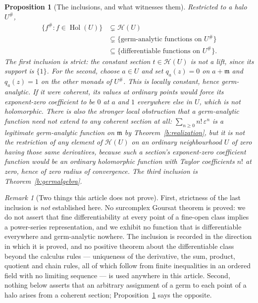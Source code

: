 \documentclass[11pt,a4paper]{article}
\numberwithin{equation}{section}
\newtheorem{proposition}[theorem]{Proposition}
\theoremstyle{definition}
\theoremstyle{remark}
\newtheorem{remark}[theorem]{Remark}
\theoremstyle{plain}
\newcommand{\mm}{\mathfrak m}
\DeclareMathOperator{\Hol}{Hol}
\newcommand{\tm}{t}
\newcommand{\halo}[1]{#1^{\#}}
\newcommand{\Hc}{\mathcal H}
\begin{document}
\begin{proposition}[The inclusions, and what witnesses them]
\label{b:inclusions}
Restricted to a halo $\halo U$,
\[
 \begin{aligned}
 \{f^{\#}:f\in\Hol(U)\}&\subsetneq\Hc(U)\\
 &\subsetneq\{\text{germ-analytic functions on }\halo U\}\\
 &\subseteq\{\text{differentiable functions on }\halo U\}.
 \end{aligned}
\]
The first inclusion is strict: the constant section $\tm\in\Hc(U)$
is not a lift, since its support is $\{1\}$. For the second, choose
$a\in U$ and set $q_a(z)=0$ on $a+\mm$ and $q_a(z)=1$ on the other
monads of $\halo U$. This is locally constant, hence germ-analytic.
If it were coherent, its values at ordinary points would force its
exponent-zero coefficient to be $0$ at $a$ and $1$ everywhere else in
$U$, which is not holomorphic. There is also the stronger local obstruction that a germ-analytic function need not extend to any coherent
section at all: $\sum_{n\ge0}n!\,\varepsilon^{n}$ is a legitimate
germ-analytic function on $\mm$ by
Theorem~\ref{b:realization}, but it is not the restriction of any element
of $\Hc(U)$ on an ordinary neighbourhood $U$ of zero having those same
derivatives, because such a section's exponent-zero coefficient function
would be an ordinary holomorphic function with Taylor coefficients $n!$
at zero, hence of zero radius of convergence. The third inclusion is
Theorem~\ref{b:germalgebra}.
\end{proposition}

\begin{remark}[Two things this article does not prove]
\label{b:no-goursat}
First, strictness of the last inclusion is \emph{not} established here.
No surcomplex Goursat theorem is proved: we do not assert that fine
differentiability at every point of a fine-open class implies a
power-series representation, and we exhibit no function that is
differentiable everywhere and germ-analytic nowhere. The inclusion is
recorded in the direction in which it is proved, and no positive theorem
about the differentiable class beyond the calculus rules --- uniqueness of
the derivative, the sum, product, quotient and chain rules, all of which
follow from finite inequalities in an ordered field with no limiting
sequence --- is used anywhere in this article. Second, nothing below
asserts that an arbitrary assignment of a germ to each point of a halo
arises from a coherent section; Proposition~\ref{b:inclusions} says the
opposite.
\end{remark}
\end{document}
